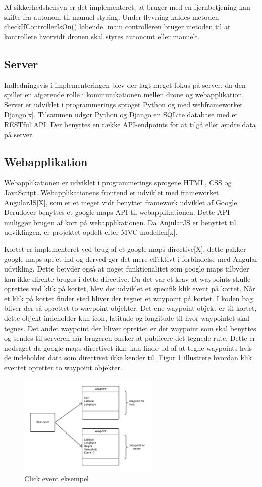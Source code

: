 Af sikkerhedshensyn er det implementeret, at bruger med en fjernbetjening kan skifte fra autonom til manuel styring. Under flyvning kaldes metoden checkIfControllerIsOn() løbende, main controlleren bruger metoden til at kontrollere hvorvidt dronen skal styres autonomt eller manuelt.  



\subsection{Server}
Indledningsvis i implementeringen blev der lagt meget fokus på server, da den spiller en afgørende rolle i kommunikationen mellen drone og webapplikation. 
Server er udviklet i programmerings sproget Python og med webframeworket Django[x].
Tilsammen udgør Python og Django en SQLite database med et RESTful API. Der benyttes en række API-endpoints for at tilgå eller ændre data på server.


\subsection{Webapplikation}
Webapplikationen  er udviklet i programmerings sprogene HTML, CSS og JavaScript. Webapplikationens frontend er udviklet med frameworket AngularJS[X], som er et meget vidt benyttet framework udviklet af Google. Derudover benyttes et google maps API til webapplikationen. Dette API muliggør brugen af kort på webapplikationen. Da AnjularJS er benyttet til udviklingen, er projektet opdelt efter MVC-modellen[x]. 

Kortet er implementeret ved brug af et google-maps directive[X], dette pakker google maps api'et ind og derved gør det mere effektivt i forbindelse med Angular udvikling. Dette betyder også at noget funktionalitet som google maps tilbyder kan ikke direkte bruges i dette directive. 
Da det var et krav at waypoints skulle oprettes ved klik på kortet, blev der udviklet et specifik klik event på kortet. Når et klik på kortet finder sted bliver der tegnet et waypoint på kortet. I koden bag bliver der så oprettet to waypoint objekter. Det ene waypoint objekt er til kortet, dette objekt indeholder kun icon, latitude og longitude til hvor waypointet skal tegnes. Det andet waypoint der bliver oprettet er det waypoint som skal benyttes og sendes til serveren når brugeren ønsker at publicere det tegnede rute. Dette er nødsaget da google-maps directivet ikke kan finde ud af at tegne waypoints hvis de indeholder data som directivet ikke kender til. Figur \ref{fig:click_event} illustrere hvordan klik eventet opretter to waypoint objekter.

\vspace{-5pt}
\begin{figure}[H]
	\centering
	\includegraphics[width=0.6\textwidth]{Billeder/click_event.png}
	\vspace{-5pt}
	\caption{Click event eksempel}
	\label{fig:click_event}
\end{figure}

